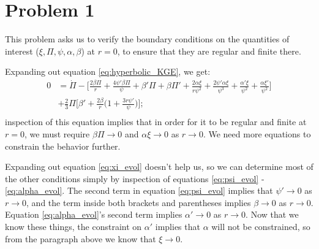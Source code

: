 \documentclass[12pt]{article}
\numberwithin{equation}{section}
\begin{document}
\section{Problem 1}
This problem asks us to verify the boundary conditions on the quantities of interest ($\xi, \Pi, \psi, \alpha, \beta$) at $r = 0$, to ensure that they are regular and finite there.

Expanding out equation \ref{eq:hyperbolic_KGE}, we get:
\begin{equation}
\begin{aligned}
0 &= \dot{\Pi} - \Big[ \frac{2 \beta \Pi}{r} + \frac{4 \psi' \beta \Pi}{\psi} + \beta' \Pi + \beta \Pi' + \frac{2 \alpha \xi}{r \psi^2} + \frac{2 \psi' \alpha \xi}{\psi^3} + \frac{\alpha' \xi}{\psi^2} + \frac{\alpha \xi'}{\psi^2} \Big] \\
&+ \frac{2}{3} \Pi \Big[ \beta' + \frac{2 \beta}{r} \Big(1 + \frac{3 r \psi'}{\psi} \Big) \Big]; \\
\end{aligned}
\end{equation}
inspection of this equation implies that in order for it to be regular and finite at $r = 0$, we must require $\beta \Pi \to 0$ and $\alpha \xi \to 0$ as $r \to 0$.  We need more equations to constrain the behavior further.

Expanding out equation \ref{eq:xi_evol} doesn't help us, so we can determine most of the other conditions simply by inspection of equations \ref{eq:psi_evol} - \ref{eq:alpha_evol}.  The second term in equation \ref{eq:psi_evol} implies that $\psi' \to 0$ as $r \to 0$, and the term inside both brackets and parentheses implies $\beta \to 0$ as $r \to 0$.  Equation \ref{eq:alpha_evol}'s second term implies $\alpha' \to 0$ as $r \to 0$.  Now that we know these things, the constraint on $\alpha'$ implies that $\alpha$ will not be constrained, so from the paragraph above we know that $\xi \to 0$.  
\end{document}
